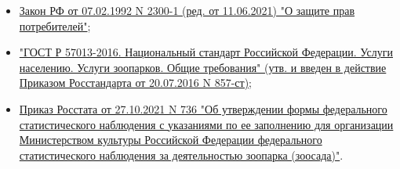\documentclass[12pt, a4paper, titlepage]{article}
\begin{document}
\begin{itemize}
    \item \href{https://student2.consultant.ru/cgi/online.cgi?req=doc&base=LAW&n=373488&dst=0#Gf5ur1TPkK5LgmbH}{Закон РФ от 07.02.1992 N 2300-1 (ред. от 11.06.2021) "О защите прав потребителей"};
    
    \item \href{https://docs.cntd.ru/document/1200137228}{"ГОСТ Р 57013-2016. Национальный стандарт Российской Федерации. Услуги населению. Услуги зоопарков. Общие требования" (утв. и введен в действие Приказом Росстандарта от 20.07.2016 N 857-ст)};
    
    \item \href{https://student2.consultant.ru/cgi/online.cgi?req=doc&rnd=XbcvLw&base=LAW&n=399590&dst=100013&field=134#2855r1TgPC7pc4QA1}{Приказ Росстата от 27.10.2021 N 736 "Об утверждении формы федерального статистического наблюдения с указаниями по ее заполнению для организации Министерством культуры Российской Федерации федерального статистического наблюдения за деятельностью зоопарка (зоосада)"}.
\end{itemize}
\end{document}
